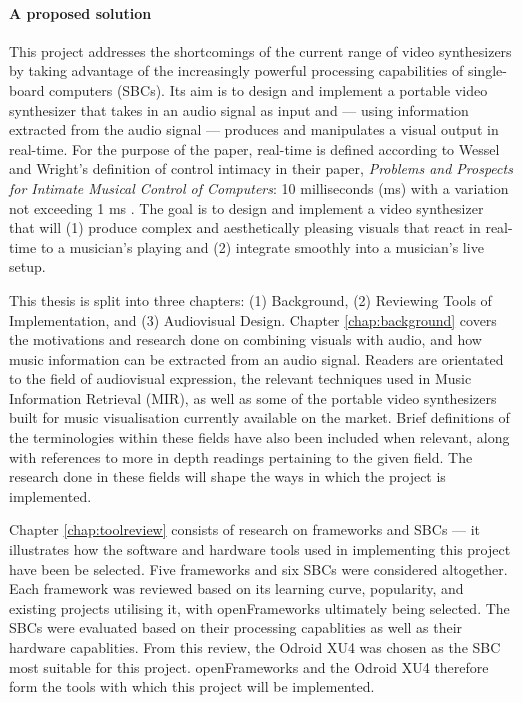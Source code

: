 \documentclass{report}
\begin{document}
\paragraph{A proposed solution}
This project addresses the shortcomings of the current range of video synthesizers by taking advantage of the increasingly powerful processing capabilities of single-board computers (SBCs). Its aim is to design and implement a portable video synthesizer that takes in an audio signal as input and --- using information extracted from the audio signal --- produces and manipulates a visual output in real-time. For the purpose of the paper, real-time is defined according to Wessel and Wright's definition of control intimacy in their paper, \textit{Problems and Prospects for Intimate Musical Control of Computers}: 10 milliseconds (ms) with a variation not exceeding 1 ms \cite{Wessel2002}. The goal is to design and implement a video synthesizer that will (1) produce complex and aesthetically pleasing visuals that react in real-time to a musician's playing and (2) integrate smoothly into a musician's live setup. \par

This thesis is split into three chapters: (1) Background, (2) Reviewing Tools of Implementation, and (3) Audiovisual Design. Chapter \ref{chap:background} covers the motivations and research done on combining visuals with audio, and how music information can be extracted from an audio signal. Readers are orientated to the field of audiovisual expression, the relevant techniques used in Music Information Retrieval (MIR), as well as some of the portable video synthesizers built for music visualisation currently available on the market. Brief definitions of the terminologies within these fields have also been included when relevant, along with references to more in depth readings pertaining to the given field. The research done in these fields will shape the ways in which the project is implemented. \par

Chapter \ref{chap:toolreview} consists of research on frameworks and SBCs --- it illustrates how the software and hardware tools used in implementing this project have been be selected. Five frameworks and six SBCs were considered altogether. Each framework was reviewed based on its learning curve, popularity, and existing projects utilising it, with openFrameworks ultimately being selected. The SBCs were evaluated based on their processing capablities as well as their hardware capablities. From this review, the Odroid XU4 was chosen as the SBC most suitable for this project. openFrameworks and the Odroid XU4 therefore form the tools with which this project will be implemented. \par
\end{document}

